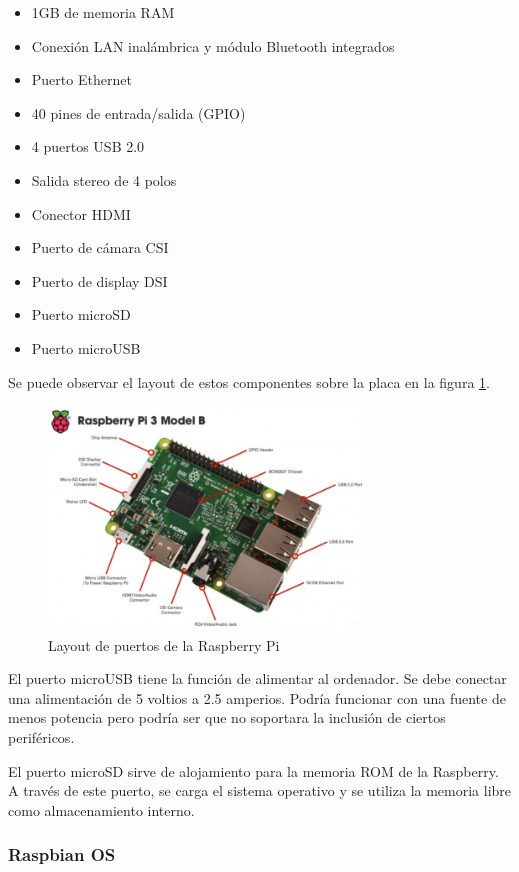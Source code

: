 \begin{itemize}
\item 1GB de memoria RAM
\item Conexión LAN inalámbrica y módulo Bluetooth integrados
\item Puerto Ethernet
\item 40 pines de entrada/salida (GPIO)
\item 4 puertos USB 2.0
\item Salida stereo de 4 polos
\item Conector HDMI
\item Puerto de cámara CSI
\item Puerto de display DSI
\item Puerto microSD
\item Puerto microUSB
\end{itemize}

Se puede observar el layout de estos componentes sobre la placa en la figura \ref{fig:RPilayout}.

\begin{figure}[tb]
\centering
\includegraphics[width=0.75\textwidth]{figuras/RPiLayout.png}
\caption{Layout de puertos de la Raspberry Pi}
\label{fig:RPilayout}
\end{figure}

El puerto microUSB tiene la función de alimentar al ordenador. Se debe conectar una alimentación de 5 voltios a 2.5 amperios. Podría funcionar con una fuente de menos potencia pero podría ser que no soportara la inclusión de ciertos periféricos.

El puerto microSD sirve de alojamiento para la memoria ROM de la Raspberry. A través de este puerto, se carga el sistema operativo y se utiliza la memoria libre como almacenamiento interno.

\subsubsection{Raspbian OS}


